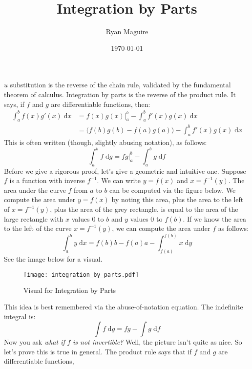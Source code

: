 \documentclass{article}
\title{Integration by Parts}
\author{Ryan Maguire}
\date{\today}
\begin{document}
    \maketitle
    $u$ substitution is the reverse of the chain rule, validated by the
    fundamental theorem of calculus. Integration by parts is the reverse of the
    product rule. It says, if $f$ and $g$ are differentiable functions, then:
    \begin{align}
        \int_{a}^{b}f(x)g'(x)\;\textrm{d}x
            &=f(x)g(x)\big|_{a}^{b}-\int_{a}^{b}f'(x)g(x)\;\textrm{d}x\\
            &=\Big(f(b)g(b)-f(a)g(a)\Big)-\int_{a}^{b}f'(x)g(x)\;\textrm{d}x
    \end{align}
    This is often written (though, slightly abusing notation), as follows:
    \begin{equation}
        \int_{a}^{b}f\;\textrm{d}g=fg\big|_{a}^{b}-\int_{a}^{b}g\;\textrm{d}f
    \end{equation}
    Before we give a rigorous proof, let's give a geometric and intuitive one.
    Suppose $f$ is a function with inverse $f^{-1}$. We can write
    $y=f(x)$ and $x=f^{-1}(y)$. The area under the curve $f$ from $a$ to $b$
    can be computed via the figure below. We compute the area under $y=f(x)$
    by noting this area, plus the area to the left of $x=f^{-1}(y)$, plus the
    area of the grey rectangle, is equal to the area of the large rectangle
    with $x$ values 0 to $b$ and $y$ values 0 to $f(b)$. If we know the area to
    the left of the curve $x=f^{-1}(y)$, we can compute the area under $f$ as
    follows:
    \begin{equation}
        \int_{a}^{b}y\;\textrm{d}x
            =f(b)b-f(a)a-\int_{f(a)}^{f(b)}x\;\textrm{d}y
    \end{equation}
    See the image below for a visual.
    \begin{figure}
        \centering
        \texttt{[image: integration\_by\_parts.pdf]}
        \caption{Visual for Integration by Parts}
    \end{figure}
    This idea is best remembered via the abuse-of-notation equation. The
    indefinite integral is:
    \begin{equation}
        \int{f}\;\textrm{d}g=fg-\int{g}\;\textrm{d}f
    \end{equation}
    Now you ask \textit{what if} $f$ \textit{is not invertible?} Well, the
    picture isn't quite as nice. So let's prove this is true in general.
    The product rule says that if $f$ and $g$ are differentiable functions,
\end{document}
